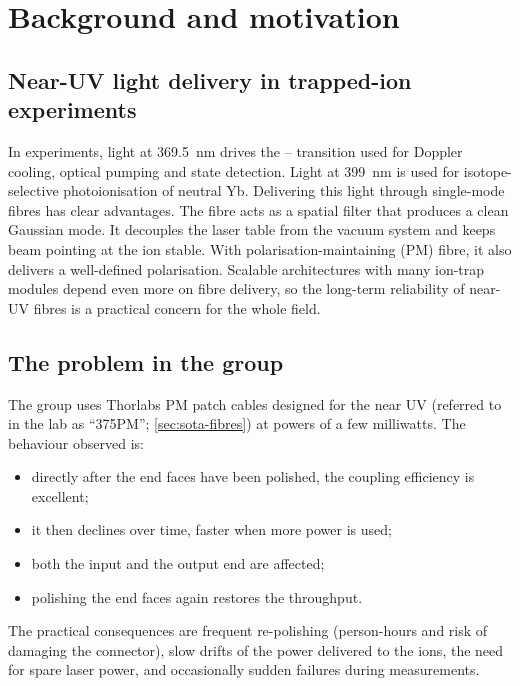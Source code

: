 \section{Background and motivation}\label{sec:background}

\subsection{Near-UV light delivery in trapped-ion experiments}
In \Ybion{} experiments, light at \SI{369.5}{nm} drives the -- transition used for
Doppler cooling, optical pumping and state detection. Light at \SI{399}{nm} is used for isotope-selective
photoionisation of neutral Yb. Delivering this light through single-mode fibres has clear advantages.
The fibre acts as a spatial filter that produces a clean Gaussian mode. It decouples the laser table
from the vacuum system and keeps beam pointing at the ion stable. With polarisation-maintaining (PM)
fibre, it also delivers a well-defined polarisation. Scalable architectures with many ion-trap modules
depend even more on fibre delivery, so the long-term reliability of near-UV fibres is a practical
concern for the whole field.

\subsection{The problem in the group}
The group uses Thorlabs PM patch cables designed for the near UV (referred to in the lab as
``375PM''; \cref{sec:sota-fibres}) at powers of a few milliwatts. The behaviour observed is:
\begin{itemize}
  \item directly after the end faces have been polished, the coupling efficiency is excellent;
  \item it then declines over time, faster when more power is used;
  \item both the input and the output end are affected;
  \item polishing the end faces again restores the throughput.
\end{itemize}
The practical consequences are frequent re-polishing (person-hours and risk of damaging the connector),
slow drifts of the power delivered to the ions, the need for spare laser power, and occasionally
sudden failures during measurements.

